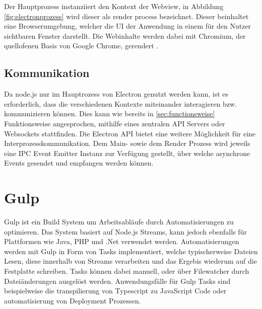 Der Hauptprozess instanziiert den Kontext der Webview, in Abbildung \ref{fig:electronprozess} wird dieser als render process bezeichnet.
Dieser beinhaltet eine Browserumgebung, welcher die \ac{UI} der Anwendung in einem für den Nutzer sichtbaren Fenster darstellt.
Die Webinhalte werden dabei mit Chromium, der quellofenen Basis von Google Chrome, gerendert \cite{Build58:online}.

\subsection{Kommunikation}

Da node.js nur im Hauptrozess von Electron genutzt werden kann, ist es erforderlich,
dass die verschiedenen Kontexte miteinander interagieren bzw. kommunizieren können.
Dies kann wie bereits in \ref{sec:functionsweise} Funktionsweise angesprochen,
mithilfe eines zentralen API Servers oder Websockets stattfinden.
Die Electron API bietet eine weitere Möglichkeit für eine Interprozesskommunikation.
Dem Main- sowie dem Render Prozess wird jeweils eine IPC Event Emitter Instanz zur Verfügung gestellt,
über welche asynchrone Events gesendet und empfangen werden können.

\section{Gulp}

Gulp ist ein Build System um Arbeitsabläufe durch Automatisierungen zu optimieren.
Das System basiert auf Node.js Streams, kann jedoch ebenfalls für Plattformen wie Java, PHP und .Net verwendet werden.
Automatisierungen werden mit Gulp in Form von Tasks implementiert,
welche typischerweise Dateien Lesen, diese innerhalb von Streams verarbeiten und das Ergebis wiederum auf die
Festplatte schreiben. Tasks können dabei manuell, oder über Filewatcher durch Dateiänderungen ausgelöst werden.
Anwendungsfälle für Gulp Tasks sind beispielweise die transpilierung von Typescript zu JavaScript Code oder
automatisierung von Deployment Prozessen.
